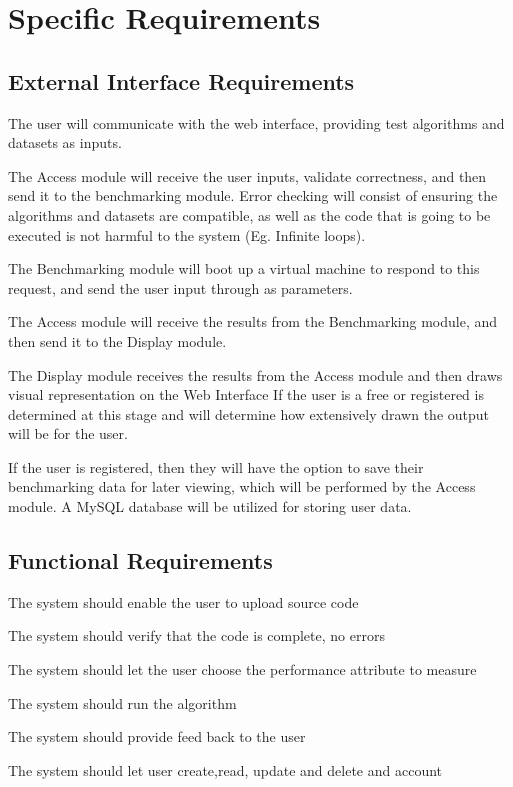 \documentclass[runningheads,a4paper]{article}
\begin{document}

\section{Specific Requirements}
	\subsection{External Interface Requirements}
		\begin{EIREnum}
			\item The user will communicate with the web interface, providing test algorithms and datasets as inputs.
			\item The Access module will receive the user inputs, validate correctness, and then send it to the benchmarking module. \newline
				Error checking will consist of ensuring the algorithms and datasets are compatible, as well as the code that is going to be executed is not harmful to the system (Eg. Infinite loops).
			\item The Benchmarking module will boot up a virtual machine to respond to this request, and send the user input through as parameters.
			\item The Access module will receive the results from the Benchmarking module, and then send it to the Display module.
			\item The Display module receives the results from the Access module and then draws visual representation on the Web Interface \newline
				If the user is a free or registered is determined at this stage and will determine how extensively drawn the output will be for the user.
			\item If the user is registered, then they will have the option to save their benchmarking data for later viewing, which will be performed by the Access module. \newline
				A MySQL database will be utilized for storing user data.
		\end{EIREnum}
	

\subsection{Functional Requirements}
	\begin{EIREnum}
		\item The system should enable the user to upload source code
		\item The system should verify that the code is complete, no errors
		\item The system should let the user choose the performance attribute to measure
		\item The system should run the algorithm
		\item The system should provide feed back to the user 
		\item The system should let user create,read, update and delete and account
	\end{EIREnum}
\end{document}

